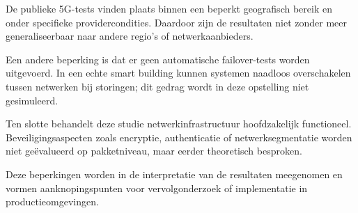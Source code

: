 De publieke 5G-tests vinden plaats binnen een beperkt geografisch bereik en onder specifieke providercondities. Daardoor zijn de resultaten niet zonder meer generaliseerbaar naar andere regio’s of netwerkaanbieders.

Een andere beperking is dat er geen automatische failover-tests worden uitgevoerd. In een echte smart building kunnen systemen naadloos overschakelen tussen netwerken bij storingen; dit gedrag wordt in deze opstelling niet gesimuleerd.

Ten slotte behandelt deze studie netwerkinfrastructuur hoofdzakelijk functioneel. Beveiligingsaspecten zoals encryptie, authenticatie of netwerksegmentatie worden niet geëvalueerd op pakketniveau, maar eerder theoretisch besproken.

Deze beperkingen worden in de interpretatie van de resultaten meegenomen en vormen aanknopingspunten voor vervolgonderzoek of implementatie in productieomgevingen.





